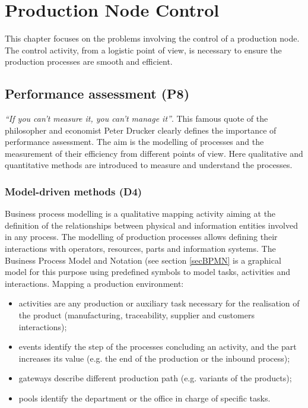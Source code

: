 \chapter{Production Node Control} \label{chapProdControl}

This chapter focuses on the problems involving the control of a production node. The control activity, from a logistic point of view, is necessary to ensure the production processes are smooth and efficient. 

\section{Performance assessment (P8)}
\textit{“If you can’t measure it, you can’t manage it”}. This famous quote of the philosopher and economist Peter Drucker clearly defines the importance of performance assessment. The aim is the modelling of processes and the measurement of their efficiency from different points of view. Here qualitative and quantitative methods are introduced to measure and understand the processes.

\subsection{Model-driven methods (D4)}

Business process modelling is a qualitative mapping activity aiming at the definition of the relationships between physical and information entities involved in any process. The modelling of production processes allows defining their interactions with operators, resources, parts and information systems. The Business Process Model and Notation (see section \ref{secBPMN} is a graphical model for this purpose using predefined symbols to model tasks, activities and interactions. Mapping a production environment:

\begin{itemize}
    \item activities are any production or auxiliary task necessary for the realisation of the product (manufacturing, traceability, supplier and customers interactions);
    \item events identify the step of the processes concluding an activity, and the part increases its value (e.g. the end of the production or the inbound process);
    \item gateways describe different production path (e.g. variants of the products);
    \item pools identify the department or the office in charge of specific tasks.

\end{itemize}

